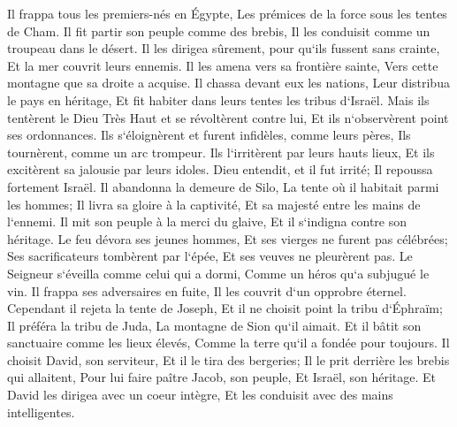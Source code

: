 \verse Il frappa tous les premiers-nés en Égypte, Les prémices de la force sous les tentes de Cham. 
\verse Il fit partir son peuple comme des brebis, Il les conduisit comme un troupeau dans le désert. 
\verse Il les dirigea sûrement, pour qu`ils fussent sans crainte, Et la mer couvrit leurs ennemis. 
\verse Il les amena vers sa frontière sainte, Vers cette montagne que sa droite a acquise. 
\verse Il chassa devant eux les nations, Leur distribua le pays en héritage, Et fit habiter dans leurs tentes les tribus d`Israël. 
\verse Mais ils tentèrent le Dieu Très Haut et se révoltèrent contre lui, Et ils n`observèrent point ses ordonnances. 
\verse Ils s`éloignèrent et furent infidèles, comme leurs pères, Ils tournèrent, comme un arc trompeur. 
\verse Ils l`irritèrent par leurs hauts lieux, Et ils excitèrent sa jalousie par leurs idoles. 
\verse Dieu entendit, et il fut irrité; Il repoussa fortement Israël. 
\verse Il abandonna la demeure de Silo, La tente où il habitait parmi les hommes; 
\verse Il livra sa gloire à la captivité, Et sa majesté entre les mains de l`ennemi. 
\verse Il mit son peuple à la merci du glaive, Et il s`indigna contre son héritage. 
\verse Le feu dévora ses jeunes hommes, Et ses vierges ne furent pas célébrées; 
\verse Ses sacrificateurs tombèrent par l`épée, Et ses veuves ne pleurèrent pas. 
\verse Le Seigneur s`éveilla comme celui qui a dormi, Comme un héros qu`a subjugué le vin. 
\verse Il frappa ses adversaires en fuite, Il les couvrit d`un opprobre éternel. 
\verse Cependant il rejeta la tente de Joseph, Et il ne choisit point la tribu d`Éphraïm; 
\verse Il préféra la tribu de Juda, La montagne de Sion qu`il aimait. 
\verse Et il bâtit son sanctuaire comme les lieux élevés, Comme la terre qu`il a fondée pour toujours. 
\verse Il choisit David, son serviteur, Et il le tira des bergeries; 
\verse Il le prit derrière les brebis qui allaitent, Pour lui faire paître Jacob, son peuple, Et Israël, son héritage. 
\verse Et David les dirigea avec un coeur intègre, Et les conduisit avec des mains intelligentes. 

